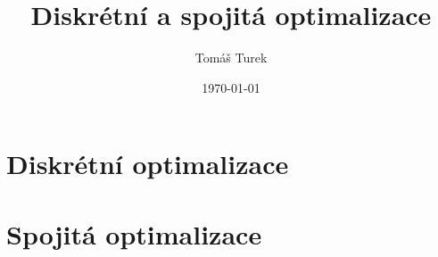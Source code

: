 
\usepackage{babel}          %

\title{Diskrétní a spojitá optimalizace}
\author{Tomáš Turek}
\date{\today}


	\maketitle
	\tableofcontents
	\part{Diskrétní optimalizace}
	\part{Spojitá optimalizace}
